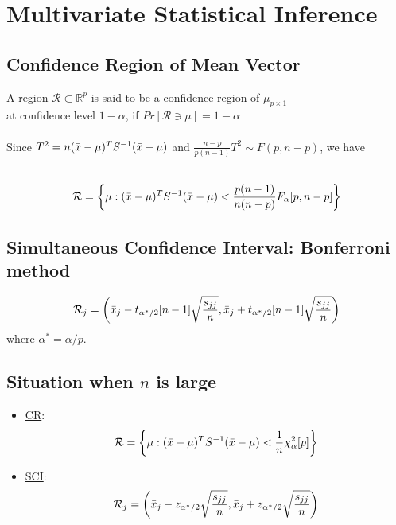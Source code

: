 \documentclass[12pt]{extarticle}
\newcommand{\<}{\langle}
\renewcommand{\>}{\rangle}
\theoremstyle{definition}
\begin{document}
\newpage
\section{Multivariate Statistical Inference}
\subsection{Confidence Region of Mean Vector}
A region $\mathcal{R} \subset \mathbb{R}^p$ is said to be a confidence region of $\mu_{p \times 1}$ \\
at confidence level $1-\alpha$, if $Pr[\mathcal{R} \owns \mu] = 1-\alpha$ \\
\ \\ 
Since $T^2 = n(\Bar{x}-\mu)^T S^{-1} (\Bar{x}-\mu)$ and $\frac{n-p}{p(n-1)}T^2 \sim F(p, n-p)$, we have\\
\ \\
\begin{tcolorbox}[enhanced, drop fuzzy shadow, title=Confidence Region]
\begin{eqnarray*}
\mathcal{R} = \left\{ \mu : (\Bar{x}-\mu)^T S^{-1} (\Bar{x}-\mu) < \frac{p(n-1)}{n(n-p)}F_{\alpha}[p, n-p] \right\}
\end{eqnarray*}
\end{tcolorbox}

\subsection{Simultaneous Confidence Interval: Bonferroni method}
\begin{tcolorbox}[enhanced, drop fuzzy shadow, title=Bonferroni's SCI]
\begin{eqnarray*}
\mathcal{R}_j = \left( \Bar{x}_j - t_{\alpha^*/2}[n-1] \sqrt{\frac{s_{jj}}{n}}, \Bar{x}_j + t_{\alpha^*/2}[n-1] \sqrt{\frac{s_{jj}}{n}} \right)
\end{eqnarray*}
where $\alpha^* = \alpha/p$.
\end{tcolorbox}


\subsection{Situation when $n$ is large}
\begin{tcolorbox}[enhanced, drop fuzzy shadow, title=CR and SCI; when $n$ is large]
\begin{itemize}
    \item \underline{CR}:
    \begin{align*}
        \mathcal{R} = \left\{ \mu : (\Bar{x}-\mu)^T S^{-1} (\Bar{x}-\mu) < \frac{1}{n}\chi^2_{\alpha}[p] \right\}
    \end{align*}
    \item \underline{SCI}:
    \begin{align*}
        \mathcal{R}_j = \left( \Bar{x}_j - z_{\alpha^*/2} \sqrt{\frac{s_{jj}}{n}}, \Bar{x}_j + z_{\alpha^*/2} \sqrt{\frac{s_{jj}}{n}} \right)
    \end{align*}
\end{itemize}
\end{tcolorbox}
\end{document}
